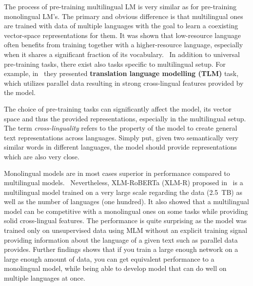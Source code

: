     
    The process of pre-training multilingual LM is very similar as for pre-training monolingual LM's. The primary and obvious difference is that multilingual ones are trained with data of multiple languages with the goal to learn a coexisting vector-space representations for them. It was shown that low-resource language often benefits from training together with a higher-resource language, especially when it shares a significant fraction of its vocabulary.~\parencite{lample2019crosslingual} In addition to universal pre-training tasks, there exist also tasks specific to multilingual setup. For example, in~\parencite{lample2019crosslingual} they presented \textbf{translation language modelling (TLM)} task, which utilizes parallel data resulting in strong cross-lingual features provided by the model.
    
    The choice of pre-training tasks can significantly affect the model, its vector space and thus the provided representations, especially in the multilingual setup. The term \emph{cross-linguality} refers to the property of the model to create general text representations across languages. Simply put, given two semantically very similar words in different languages, the model should provide representations which are also very close.
    
    Monolingual models are in most cases superior in performance compared to multilingual models.~\parencite{Martin_2020,Dumitrescu_2020} Nevertheless, XLM-RoBERTa (XLM-R) proposed in~\parencite{Conneau_2020} is a multilingual model trained on a very large scale regarding the data (2.5~TB) as well as the number of languages (one hundred). It also showed that a multilingual model can be competitive with a monolingual ones on some tasks while providing solid cross-lingual features. The performance is quite surprising as the model was trained only on unsupervised data using MLM without an explicit training signal providing information about the language of a given text such as parallel data provides. Further findings shows that if you train a large enough network on a large enough amount of data, you can get equivalent performance to a monolingual model, while being able to develop model that can do well on multiple languages at once.~\parencite{li2021scaling}
    

